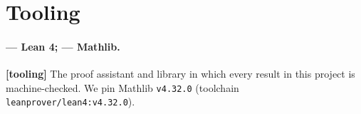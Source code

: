\documentclass[11pt]{article}
\begin{document}
\section*{Tooling}

\paragraph{\citet{moura2021} --- Lean 4; \citet{mathlib2020} ---
Mathlib.} \textbf{[tooling]}
The proof assistant and library in which every result in this project is
machine-checked. We pin Mathlib \texttt{v4.32.0} (toolchain
\texttt{leanprover/lean4:v4.32.0}).



\end{document}

